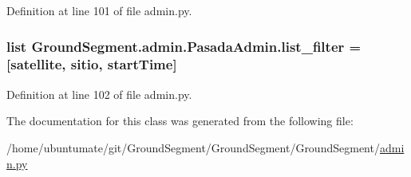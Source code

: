 Definition at line 101 of file admin.\+py.

\hypertarget{class_ground_segment_1_1admin_1_1_pasada_admin_a0d175d7e720a4cfe8be383bbd0050dd8}{}
\subsubsection[{list\+\_\+filter}]{\setlength{\rightskip}{0pt plus 5cm}list Ground\+Segment.\+admin.\+Pasada\+Admin.\+list\+\_\+filter = \mbox{[}\textquotesingle{}satellite\textquotesingle{}, \textquotesingle{}sitio\textquotesingle{}, \textquotesingle{}start\+Time\textquotesingle{}\mbox{]}\hspace{0.3cm}{\ttfamily [static]}}\label{class_ground_segment_1_1admin_1_1_pasada_admin_a0d175d7e720a4cfe8be383bbd0050dd8}


Definition at line 102 of file admin.\+py.



The documentation for this class was generated from the following file\+:\begin{DoxyCompactItemize}
\item 
/home/ubuntumate/git/\+Ground\+Segment/\+Ground\+Segment/\+Ground\+Segment/\hyperlink{admin_8py}{admin.\+py}\end{DoxyCompactItemize}
